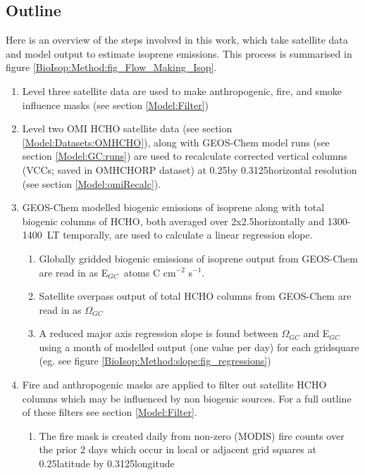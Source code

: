   \subsection{Outline}
    Here is an overview of the steps involved in this work, which take satellite data and model output to estimate isoprene emissions.
    This process is summarised in figure \ref{BioIsop:Method:fig_Flow_Making_Isop}.
    \begin{enumerate}
      \item 
        Level three satellite data are used to make anthropogenic, fire, and smoke influence masks (see section \ref{Model:Filter})
      \item 
        Level two OMI HCHO satellite data (see section \ref{Model:Datasets:OMHCHO}), along with GEOS-Chem model runs (see section \ref{Model:GC:runs}) are used to recalculate corrected vertical columns (VCCs; saved in OMHCHORP dataset) at 0.25\degr by 0.3125\degr horizontal resolution (see section \ref{Model:omiRecalc}).
      \item 
        GEOS-Chem modelled biogenic emissions of isoprene along with total biogenic columns of HCHO, both averaged over 2x2.5\degr horizontally  and 1300-1400~LT temporally, are used to calculate a linear regression slope.
      \begin{enumerate}
        \item Globally gridded biogenic emissions of isoprene output from GEOS-Chem are read in as E$_{GC}$~atoms C cm$^{-2}$ s$^{-1}$.
        \item Satellite overpass output of total HCHO columns from GEOS-Chem are read in as $\Omega_{GC}$\moleccm
        \item A reduced major axis regression slope is found between $\Omega_{GC}$ and E$_{GC}$ using a month of modelled output (one value per day) for each gridsquare (eg. see figure \ref{BioIsop:Method:slope:fig_regressions})
      \end{enumerate}
      \item 
        Fire and anthropogenic masks are applied to filter out satellite HCHO columns which may be influenced by non biogenic sources.
        For a full outline of these filters see section \ref{Model:Filter}.
      \begin{enumerate}
        \item 
          The fire mask is created daily from non-zero (MODIS) fire counts over the prior 2 days which occur in local or adjacent grid squares at 0.25\degr latitude by 0.3125\degr longitude

\end{enumerate}
\end{enumerate}
